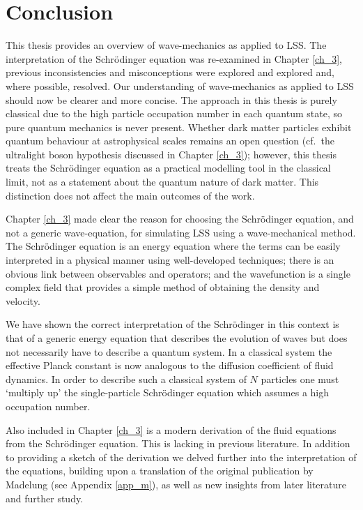 %
%
\chapter{Conclusion}
\label{ch_6}
This thesis provides an overview of wave-mechanics as applied to LSS. The interpretation of the Schr\"odinger equation was re-examined in Chapter \ref{ch_3}, previous inconsistencies and misconceptions were explored and explored and, where possible, resolved. Our understanding of wave-mechanics as applied to LSS should now be clearer and more concise. The approach in this thesis is purely classical due to the high particle occupation number in each quantum state, so pure quantum mechanics is never present. Whether dark matter particles exhibit quantum behaviour at astrophysical scales remains an open question (cf.\ the ultralight boson hypothesis discussed in Chapter \ref{ch_3}); however, this thesis treats the Schr\"odinger equation as a practical modelling tool in the classical limit, not as a statement about the quantum nature of dark matter. This distinction does not affect the main outcomes of the work.

Chapter \ref{ch_3} made clear the reason for choosing the Schr\"odinger equation, and not a generic wave-equation, for simulating LSS using a wave-mechanical method. The Schr\"odinger equation is an energy equation where the terms can be easily interpreted in a physical manner using well-developed techniques; there is an obvious link between observables and operators; and the wavefunction is a single complex field that provides a simple method of obtaining the density and velocity.

We have shown the correct interpretation of the Schr\"odinger in this context is that of a generic energy equation that describes the evolution of waves but does not necessarily have to describe a quantum system. In a classical system the effective Planck constant is now analogous to the diffusion coefficient of fluid dynamics. In order to describe such a classical system of $N$ particles one must `multiply up' the single-particle Schr\"odinger equation which assumes a high occupation number.

Also included in Chapter \ref{ch_3} is a modern derivation of the fluid equations from the Schr\"odinger equation. This is lacking in previous  literature. In addition to providing a sketch of the derivation we delved further into the interpretation of the equations, building upon a translation of the original publication by Madelung (see Appendix \ref{app_m}), as well as new insights from later literature and further study.

